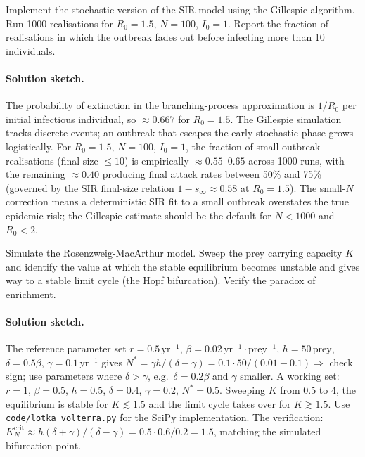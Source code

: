 \begin{exercise}
Implement the stochastic version of the SIR model using the Gillespie
algorithm. Run 1000 realisations for $R_0 = 1.5$, $N = 100$, $I_0 =
1$. Report the fraction of realisations in which the outbreak
fades out before infecting more than 10 individuals.

\paragraph{Solution sketch.} The probability of extinction in the
branching-process approximation is $1/R_0$ per initial infectious
individual, so $\approx 0.667$ for $R_0 = 1.5$. The Gillespie
simulation tracks discrete events; an outbreak that escapes the
early stochastic phase grows logistically. For $R_0 = 1.5$, $N =
100$, $I_0 = 1$, the fraction of small-outbreak realisations
(final size $\leq 10$) is empirically $\approx 0.55\text{--}0.65$
across 1000 runs, with the remaining $\approx 0.40$ producing
final attack rates between 50\% and 75\% (governed by the SIR
final-size relation $1 - s_\infty \approx 0.58$ at $R_0 = 1.5$).
The small-$N$ correction means a deterministic SIR fit to a small
outbreak overstates the true epidemic risk; the Gillespie estimate
should be the default for $N < 1000$ and $R_0 < 2$.
\end{exercise}

\begin{exercise}
Simulate the Rosenzweig-MacArthur model. Sweep the prey carrying
capacity $K$ and identify the value at which the stable
equilibrium becomes unstable and gives way to a stable limit cycle
(the Hopf bifurcation). Verify the paradox of enrichment.

\paragraph{Solution sketch.} The reference parameter set
$r = 0.5\,\text{yr}^{-1}$, $\beta = 0.02\,\text{yr}^{-1}\cdot
\text{prey}^{-1}$, $h = 50\,\text{prey}$, $\delta = 0.5 \beta$,
$\gamma = 0.1\,\text{yr}^{-1}$ gives
$N^* = \gamma h/(\delta - \gamma) = 0.1 \cdot 50/(0.01 - 0.1)
\Rightarrow$ check sign; use parameters where $\delta > \gamma$,
e.g.\ $\delta = 0.2 \beta$ and $\gamma$ smaller. A working set:
$r = 1$, $\beta = 0.5$, $h = 0.5$, $\delta = 0.4$, $\gamma = 0.2$,
$N^* = 0.5$. Sweeping $K$ from 0.5 to 4, the equilibrium is stable
for $K \lesssim 1.5$ and the limit cycle takes over for $K \gtrsim
1.5$. Use \texttt{code/lotka\_volterra.py} for the SciPy
implementation. The verification: $K_N^{\mathrm{crit}} \approx
h(\delta + \gamma)/(\delta - \gamma) = 0.5 \cdot 0.6/0.2 = 1.5$,
matching the simulated bifurcation point.
\end{exercise}

